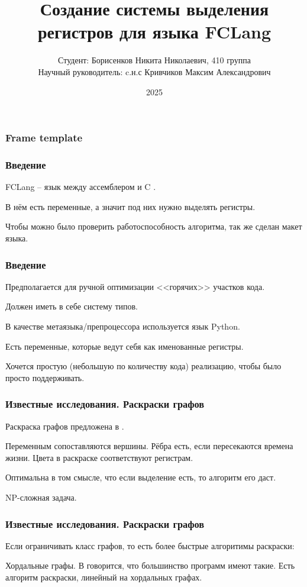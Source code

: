 \documentclass[10pt,a4paper]{beamer}
\title{Создание системы выделения регистров для языка FCLang}
\author{Студент: Борисенков Никита Николаевич, 410 группа\\
Научный руководитель: c.н.с Кривчиков Максим Александрович}
\date{2025}
\begin{document}
\maketitle

\begin{frame}
    \frametitle{Frame template}

\end{frame}

\begin{frame}
    \frametitle{Введение}

    FCLang -- язык между ассемблером и C \cite{____2023}.

    В нём есть переменные, а значит под них нужно выделять регистры.

    Чтобы можно было проверить работоспособность алгоритма, так же сделан макет языка.

\end{frame}

\begin{frame}
    \frametitle{Введение}

    Предполагается для ручной оптимизации <<горячих>> участков кода.

    Должен иметь в себе систему типов.

    В качестве метаязыка/препроцессора используется язык Python.

    Есть переменные, которые ведут себя как именованные регистры.

    Хочется простую (небольшую по количеству кода) реализацию, чтобы было просто поддерживать.

\end{frame}

\begin{frame}
    \frametitle{Известные исследования. Раскраски графов}
    Раскраска графов предложена в \cite{chaitin_register_1981}.

    Переменным сопоставляются вершины. Рёбра есть, если пересекаются времена жизни.
    Цвета в раскраске соответствуют регистрам.

    Оптимальна в том смысле, что если выделение есть, то алгоритм его даст.

    NP-сложная задача.

\end{frame}

\begin{frame}
    \frametitle{Известные исследования. Раскраски графов}
    Если ограничивать класс графов, то есть более быстрые алгоритимы раскраски:

    Хордальные графы.
    В \cite{hutchison_register_2005} говорится, что большинство программ имеют такие.
    Есть алгоритм раскраски, линейный на хордальных графах.
\end{frame}
\end{document}
